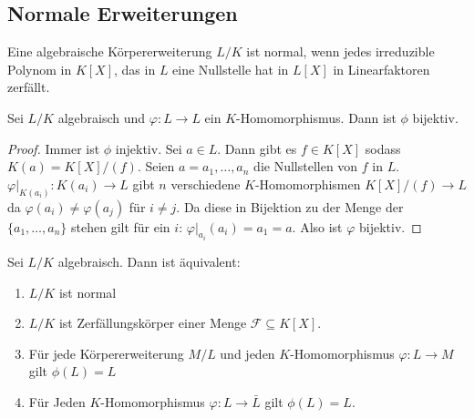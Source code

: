 \subsection{Normale Erweiterungen}
\begin{Def}
    Eine algebraische Körpererweiterung \(L/K\) ist normal, wenn jedes irreduzible Polynom in \(K[X]\), das in \(L\) eine Nullstelle hat in \(L[X]\) in Linearfaktoren zerfällt.
\end{Def}
\begin{Lemma}
    Sei \(L/K\) algebraisch und \(\varphi\colon L\to L\) ein \(K\)-Homomorphismus. Dann ist \(\phi\) bijektiv.
\end{Lemma}
\begin{proof}
    Immer ist \(\phi\) injektiv.
    Sei \(a\in L\). Dann gibt es \(f\in K[X]\) sodass \(K(a)=K[X]/(f)\). Seien \(a=a_1,\dots,a_n\) die Nullstellen von \(f\) in \(L\).
    \(\varphi|_{K(a_i)}\colon K(a_i)\to L\) gibt \(n\) verschiedene \(K\)-Homomorphismen \(K[X]/(f)\to L\) da \(\varphi(a_i)\neq \varphi(a_j)\) für \(i\neq j\). Da diese in Bijektion zu der Menge der \(\{a_1,\dots,a_n\}\) stehen gilt für ein \(i\): \(\varphi|_{a_i}(a_i)=a_1=a\). Also ist \(\varphi\) bijektiv.
\end{proof}
\begin{Satz}
    Sei \(L/K\) algebraisch. Dann ist äquivalent:
    \begin{enumerate}
        \item \(L/K\) ist normal
        \item \(L/K\) ist Zerfällungskörper einer Menge \(\mathcal F\subseteq K[X]\).
        \item Für jede Körpererweiterung \(M/L\) und jeden \(K\)-Homomorphismus \(\varphi\colon L\to M\) gilt \(\phi(L)=L\)
        \item Für Jeden \(K\)-Homomorphismus \(\varphi\colon L\to\bar L\) gilt \(\phi(L)=L\).
    \end{enumerate}
\end{Satz}
